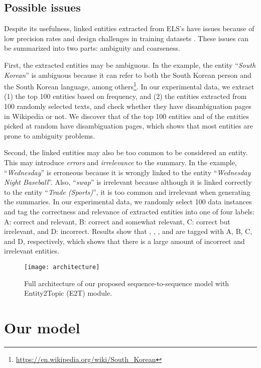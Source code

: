 \documentclass[11pt,a4paper]{article}
\begin{document}
\subsection{Possible issues}
\label{sec:issues}

Despite its usefulness, linked entities extracted from ELS's 
have issues because of low precision rates
\cite{hasibi2016reproducibility} and design challenges in training datasets \cite{ling2015design}. These issues can be summarized into two parts: ambiguity and coarseness.


First, the extracted entities may be ambiguous. In the example, the entity ``\textit{South Korean}'' is ambiguous because it can refer to both the South Korean person and the South Korean language, among others\footnote{\url{https://en.wikipedia.org/wiki/South_Korean}}.
In our experimental data, we extract (1) the top 100 entities based on frequency, and (2) the entities extracted from 100 randomly selected texts, and check whether they have disambiguation pages in Wikipedia or not. We discover that  of the top 100 entities and  of the entities picked at random have disambiguation pages, which shows that most entities are prone to ambiguity problems.

Second, the linked entities may also be too common to be considered an entity.
This may introduce \textit{errors} and \textit{irrelevance} to the summary.
In the example, ``\textit{Wednesday}'' is erroneous because it is wrongly linked to the entity ``\textit{Wednesday Night Baseball}''. Also, ``\textit{swap}'' is irrelevant because although it is linked correctly to the entity ``\textit{Trade (Sports)}'', it is too common and irrelevant when generating the summaries. In our experimental data, we randomly select 100 data instances and tag the correctness and relevance of extracted entities into one of four labels: A: correct and relevant, B: correct and somewhat relevant, C: correct but irrelevant, and D: incorrect. Results show that , , , and  are tagged with A, B, C, and D, respectively, which shows that there is a large amount of incorrect and irrelevant entities.

\begin{figure*}[t]
    \centering
    \texttt{[image: architecture]}
    \caption{Full architecture of our proposed sequence-to-sequence model with Entity2Topic (E2T) module.}
    \label{fig:model}
\end{figure*}

\section{Our model}
\end{document}
